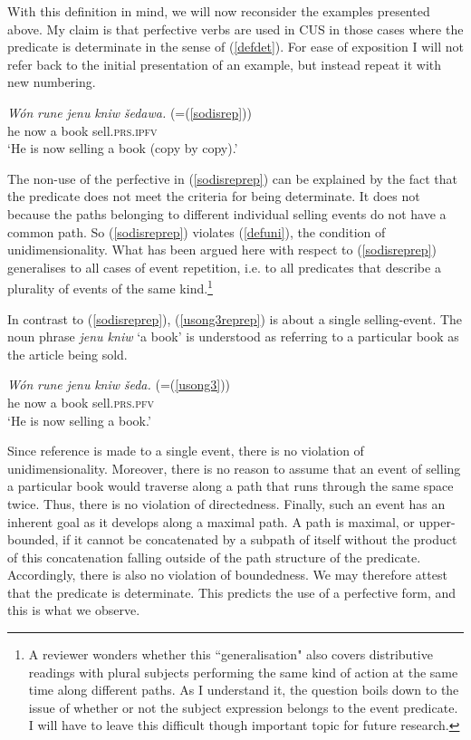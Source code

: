 \documentclass[output=paper,colorlinks,citecolor=brown]{langscibook}
\begin{document}
\noindent With this definition in mind, we will now reconsider the examples presented above. My claim is that perfective verbs are used in CUS in those cases where the predicate is determinate in the sense of (\ref{defdet}). For ease of exposition I will not refer back to the initial presentation of an example, but instead repeat it with new numbering.  

 \ea\label{sodisreprep}
\gll \textit{W\'on} \textit{rune} \textit{jenu} \textit{kniw} \textit{šedawa.} \hfill
(=(\ref{sodisrep}))\\
he now a book sell.\textsc{prs.ipfv}\\
\glt \normalsize{`He is now selling a book (copy by copy).'}
\z

\noindent The non-use of the perfective in (\ref{sodisreprep}) can be explained by the fact that the predicate does not meet the criteria for being determinate. It does not because the 
paths belonging to different individual selling events do not have a common path. So (\ref{sodisreprep}) violates (\ref{defuni}), the condition of unidimensionality. What has been argued here with respect to (\ref{sodisreprep}) generalises to all cases of event repetition, i.e. to all predicates that describe a plurality of events of the same kind.\footnote{A reviewer wonders whether this ``generalisation" also covers distributive readings with plural subjects performing the same kind of action at the same time along different paths. As I understand it, the question boils down to the issue of whether or not the subject expression belongs to the event predicate. I will have to leave this difficult though important topic for future research.}  

In contrast to (\ref{sodisreprep}), (\ref{usong3reprep}) is about a single selling-event. The noun phrase 
\textit{jenu kniw} `a book' is understood as referring to a 
particular book as the article being sold. 

 \ea\label{usong3reprep}
\gll \textit{W\'on} \textit{rune} \textit{jenu} \textit{kniw} \textit{šeda.} \hfill(=(\ref{usong3}))\\
he now a book sell.\textsc{prs.pfv}\\
\glt \normalsize{`He is now selling a book.'}
\z

\noindent Since reference is made to a single event, there is no violation of unidimensionality. Moreover, there is no reason to assume that an event of selling a particular book would traverse along a path that runs through the same space twice. Thus, there is no violation of directedness. Finally, such an event has an inherent goal as it develops along a maximal path. A path is maximal, or upper-bounded, if it cannot be concatenated by a subpath of itself without the product of this concatenation falling outside of the path structure of the predicate. Accordingly, there is also no violation of boundedness. We may therefore attest that the predicate is determinate. This predicts the use of a perfective form, and this is what we observe. 
\end{document}
